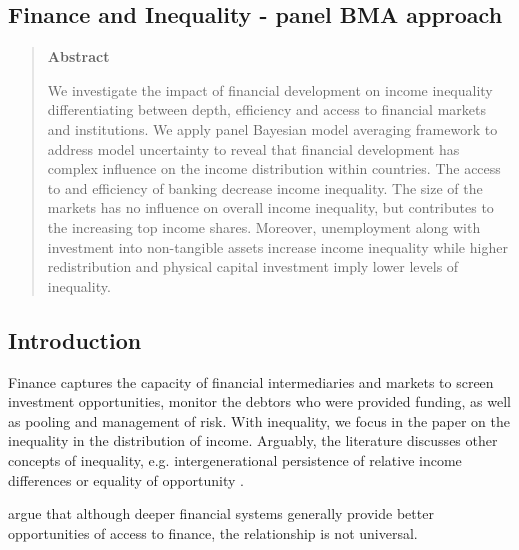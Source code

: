 \begin{refsection}
\chapter{Finance and Inequality - panel BMA approach}
\label{ch4}

\begin{quote}
\begin{center}\textbf{Abstract}\end{center}
	We investigate the impact of financial development on income inequality differentiating between depth, efficiency and access to financial markets and institutions. We apply panel Bayesian model averaging framework to address model uncertainty to reveal that financial development has complex influence on the income distribution within countries. The access to and efficiency of banking decrease income inequality. The size of the markets has no influence on overall income inequality, but contributes to the increasing top income shares. Moreover, unemployment along with investment into non-tangible assets increase income inequality while higher redistribution and physical capital investment imply lower levels of inequality.  
	\end{quote}

\newpage
\section{Introduction}
\label{ch4sec:intro}

Finance captures the capacity of financial intermediaries and markets to screen investment opportunities, monitor the debtors who were provided funding, as well as pooling and management of risk. With inequality, we focus in the paper on the inequality in the distribution of income. Arguably, the literature discusses other concepts of inequality, e.g. intergenerational persistence of relative income differences or equality of opportunity \parencite{demirgucc2009finance}.

\textcite{claessens2007finance} argue that although deeper financial systems generally provide better opportunities of access to finance, the relationship is not universal.


\end{refsection}
